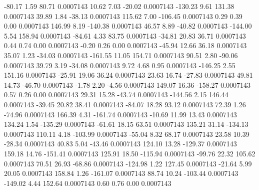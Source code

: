       -80.17        1.59       80.71     0.0007143
       10.62        7.03      -20.02     0.0007143
     -130.23        9.61      131.38     0.0007143
       39.89        1.84      -38.13     0.0007143
      115.62        7.00     -106.45     0.0007143
        0.29        0.39        0.00     0.0007143
      146.99        8.19     -140.38     0.0007143
       46.57        8.89      -40.82     0.0007143
     -144.00        5.54      158.94     0.0007143
      -84.61        4.33       83.75     0.0007143
      -34.81       20.83       36.71     0.0007143
        0.44        0.74        0.00     0.0007143
       -0.20        0.26        0.00     0.0007143
      -45.94       12.66       36.18     0.0007143
       35.07        1.23      -34.03     0.0007143
     -161.55       11.05      154.71     0.0007143
       90.51        2.80      -90.06     0.0007143
       39.79        3.19      -34.08     0.0007143
        9.72        4.68        0.95     0.0007143
     -146.25        2.55      151.16     0.0007143
      -25.91       19.06       36.24     0.0007143
       23.63       16.74      -27.83     0.0007143
       49.81       14.73      -46.70     0.0007143
       -1.78        2.20       -4.56     0.0007143
      149.07       16.36     -158.27     0.0007143
        0.57        0.26        0.00     0.0007143
       29.31       15.28      -43.74     0.0007143
     -144.56        2.15      146.44     0.0007143
      -39.45       20.82       38.41     0.0007143
      -84.07       18.28       93.12     0.0007143
       72.39        1.26      -74.96     0.0007143
      166.39        4.31     -161.74     0.0007143
      -10.69       11.99       13.43     0.0007143
      134.24        1.54     -135.29     0.0007143
      -61.61       18.15       63.51     0.0007143
      135.21       31.14     -134.13     0.0007143
      110.11        4.18     -103.99     0.0007143
      -55.04        8.32       68.17     0.0007143
       23.58       10.39      -28.34     0.0007143
       40.83        5.04      -43.46     0.0007143
      124.10       13.28     -129.37     0.0007143
      159.18       14.76     -151.41     0.0007143
      125.91       18.50     -115.94     0.0007143
      -99.76       22.32      105.62     0.0007143
       70.51       26.93      -68.86     0.0007143
     -124.98        1.22      127.45     0.0007143
      -21.64        5.99       20.05     0.0007143
      158.84        1.26     -161.07     0.0007143
       88.74       10.24     -103.44     0.0007143
     -149.02        4.44      152.64     0.0007143
        0.60        0.76        0.00     0.0007143
